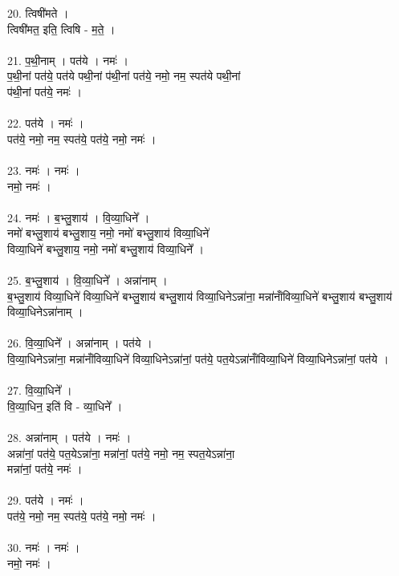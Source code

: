 20. त्विषी॑मते ।\\
त्विषी॑मत॒ इति॒ त्विषि - म॒ते॒ ।\\
\\
21. प॒थी॒नाम् । पत॑ये । नमः॑ ।\\
प॒थी॒नां पत॑ये॒ पत॑ये पथी॒नां प॑थी॒नां पत॑ये॒ नमो॒ नम॒ स्पत॑ये पथी॒नां\\
प॑थी॒नां पत॑ये॒ नमः॑ ।\\
\\
22. पत॑ये । नमः॑ ।\\
पत॑ये॒ नमो॒ नम॒ स्पत॑ये॒ पत॑ये॒ नमो॒ नमः॑ ।\\
\\
23. नमः॑ । नमः॑ ।\\
नमो॒ नमः॑ ।\\
\\
24. नमः॑ । ब॒भ्लु॒शाय॑ । वि॒व्या॒धिने᳚ ।\\
नमो॑ बभ्लु॒शाय॑ बभ्लु॒शाय॒ नमो॒ नमो॑ बभ्लु॒शाय॑ विव्या॒धिने॑\\
विव्या॒धिने॑ बभ्लु॒शाय॒ नमो॒ नमो॑ बभ्लु॒शाय॑ विव्या॒धिने᳚ ।\\
\\
25. ब॒भ्लु॒शाय॑ । वि॒व्या॒धिने᳚ । अन्ना॑नाम् ।\\
ब॒भ्लु॒शाय॑ विव्या॒धिने॑ विव्या॒धिने॑ बभ्लु॒शाय॑ बभ्लु॒शाय॑ विव्या॒धिनेऽन्ना॑ना॒ मन्ना॑नांँविव्या॒धिने॑ बभ्लु॒शाय॑ बभ्लु॒शाय॑ विव्या॒धिनेऽन्ना॑नाम् ।\\
\\
26. वि॒व्या॒धिने᳚ । अन्ना॑नाम् । पत॑ये ।\\
वि॒व्या॒धिनेऽन्ना॑ना॒ मन्ना॑नांँविव्या॒धिने॑ विव्या॒धिनेऽन्ना॑नां॒ पत॑ये॒ पत॒येऽन्ना॑नांँविव्या॒धिने॑ विव्या॒धिनेऽन्ना॑नां॒ पत॑ये ।\\
\\
27. वि॒व्या॒धिने᳚ ।\\
वि॒व्या॒धिन॒ इति॑ वि - व्या॒धिने᳚ ।\\
\\
28. अन्ना॑नाम् । पत॑ये । नमः॑ ।\\
अन्ना॑नां॒ पत॑ये॒ पत॒येऽन्ना॑ना॒ मन्ना॑नां॒ पत॑ये॒ नमो॒ नम॒ स्पत॒येऽन्ना॑ना॒\\
मन्ना॑नां॒ पत॑ये॒ नमः॑ ।\\
\\
29. पत॑ये । नमः॑ ।\\
पत॑ये॒ नमो॒ नम॒ स्पत॑ये॒ पत॑ये॒ नमो॒ नमः॑ ।\\
\\
30. नमः॑ । नमः॑ ।\\
नमो॒ नमः॑ ।\\
\\
